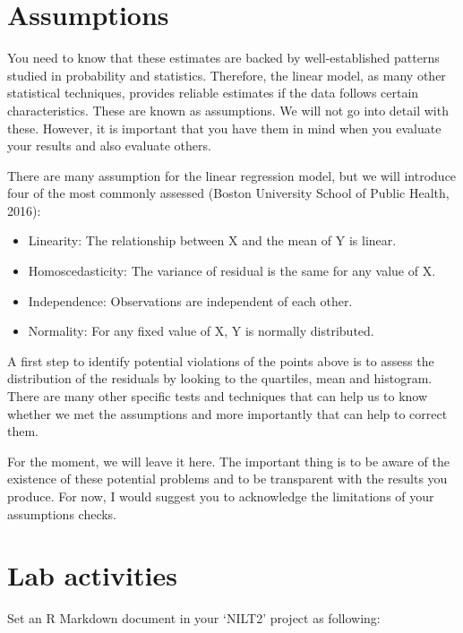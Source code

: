 \documentclass[
]{book}
\providecommand{\tightlist}{%
  \setlength{\itemsep}{0pt}\setlength{\parskip}{0pt}}
\begin{document}
\hypertarget{assumptions}{%
\section{Assumptions}\label{assumptions}}

You need to know that these estimates are backed by well-established patterns studied in probability and statistics. Therefore, the linear model, as many other statistical techniques, provides reliable estimates if the data follows certain characteristics. These are known as assumptions. We will not go into detail with these. However, it is important that you have them in mind when you evaluate your results and also evaluate others.

There are many assumption for the linear regression model, but we will introduce four of the most commonly assessed (Boston University School of Public Health, 2016):

\begin{itemize}
\tightlist
\item
  Linearity: The relationship between X and the mean of Y is linear.
\item
  Homoscedasticity: The variance of residual is the same for any value of X.
\item
  Independence: Observations are independent of each other.
\item
  Normality: For any fixed value of X, Y is normally distributed.
\end{itemize}

A first step to identify potential violations of the points above is to assess the distribution of the residuals by looking to the quartiles, mean and histogram. There are many other specific tests and techniques that can help us to know whether we met the assumptions and more importantly that can help to correct them.

For the moment, we will leave it here. The important thing is to be aware of the existence of these potential problems and to be transparent with the results you produce. For now, I would suggest you to acknowledge the limitations of your assumptions checks.

\hypertarget{lab-activities-1}{%
\section{Lab activities}\label{lab-activities-1}}

Set an R Markdown document in your `NILT2' project as following:
\end{document}
